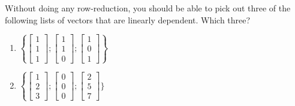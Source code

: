 \endedxtext






Without doing any row-reduction, you should be able to pick out three of the 
following lists of vectors that are linearly dependent.  Which three?  

\begin{enumerate}


\item
$\left\{ \left[ \begin{array}{c} 1 \\ 1 \\ 1 \end{array} \right]; 
\left[ \begin{array}{c} 1 \\ 1 \\ 0 \end{array} \right]; 
\left[ \begin{array}{c} 1 \\ 0 \\ 1 \end{array} \right] \right\}
$


\item
$\left\{\left[ \begin{array}{c} 1 \\ 2 \\ 3 \end{array} \right] ; 
\left[ \begin{array}{c} 0 \\ 0 \\ 0 \end{array} \right] ; 
\left[ \begin{array}{c} 2 \\ 5 \\ 7 \end{array} \right]\} $




\end{enumerate}

